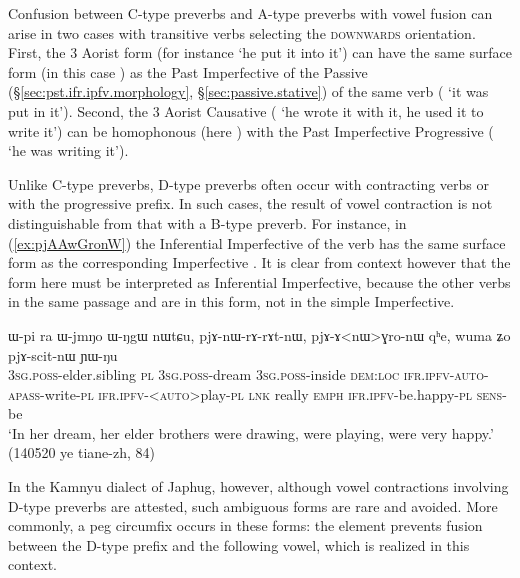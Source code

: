 Confusion between C-type preverbs and A-type preverbs with vowel fusion can arise in two cases with transitive verbs selecting  the \textsc{downwards} orientation. First, the 3\flobv{} Aorist form (for instance  `he put it into it') can have the same surface form (in this case ) as the Past Imperfective of the Passive (§\ref{sec:pst.ifr.ipfv.morphology}, §\ref{sec:passive.stative}) of the same verb ( `it was put in it'). Second, the 3\flobv{} Aorist Causative ( `he wrote it with it, he used it to write it') can be homophonous (here ) with the Past Imperfective  Progressive ( `he was writing it').

Unlike C-type preverbs, D-type preverbs often occur with contracting verbs or with the progressive prefix. In such cases, the result of vowel contraction is not distinguishable from that with a B-type preverb. For instance, in (\ref{ex:pjAAwGronW}) the Inferential Imperfective  of the verb  has the same surface form  as the corresponding Imperfective  . It is clear from context however that the form here must be interpreted as Inferential Imperfective, because the other verbs in the same passage  and  are in this form, not in the simple Imperfective.

\begin{exe}
\ex \label{ex:pjAAwGronW}
 \gll ɯ-pi ra ɯ-jmŋo ɯ-ŋgɯ nɯtɕu, pjɤ-nɯ-rɤ-rɤt-nɯ, pjɤ-ɤ<nɯ>ɣro-nɯ qʰe, wuma ʑo pjɤ-scit-nɯ ɲɯ-ŋu \\
 \textsc{3sg}.\textsc{poss}-elder.sibling \textsc{pl} \textsc{3sg}.\textsc{poss}-dream \textsc{3sg}.\textsc{poss}-inside \textsc{dem}:\textsc{loc} \textsc{ifr}.\textsc{ipfv}-\textsc{auto}-\textsc{apass}-write-\textsc{pl}  \textsc{ifr}.\textsc{ipfv}-<\textsc{auto}>play-\textsc{pl} \textsc{lnk} really \textsc{emph} \textsc{ifr}.\textsc{ipfv}-be.happy-\textsc{pl} \textsc{sens}-be \\
 \glt `In her dream, her elder brothers were drawing, were playing, were very happy.' (140520 ye tiane-zh, 84)
\end{exe}

In the Kamnyu dialect of Japhug, however, although vowel contractions involving D-type preverbs are attested, such ambiguous forms are rare and avoided. More commonly, a peg circumfix  occurs in these forms: the  element prevents fusion between the D-type prefix and the following vowel, which is realized  in this context. 

